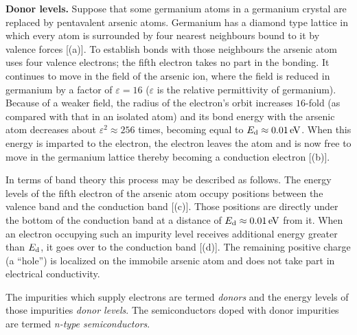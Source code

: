 \textbf{Donor levels.} Suppose that some germanium atoms in a germanium crystal are replaced by pentavalent arsenic atoms. Germanium has a diamond type lattice in which every atom is surrounded by four nearest neighbours bound to it by valence forces [(a)]. To establish bonds with those neighbours the arsenic atom uses four valence electrons; the fifth electron takes no part in the bonding. It continues to move in the field of the arsenic ion, where the field is reduced in germanium by a factor of $\varepsilon=16$ ($\varepsilon$ is the relative permittivity of germanium). Because of a weaker field, the radius of the electron's orbit increases $16$-fold (as compared with that in an isolated atom) and its bond energy with the arsenic atom decreases about $\varepsilon^2\approx 256$ times, becoming equal to $E_{\text{d}}\approx\SI{0.01}{\electronvolt}$. When this energy is imparted to the electron, the electron leaves the atom and is now free to move in the germanium lattice thereby becoming a conduction electron [(b)].

In terms of band theory this process may be described as follows. The energy levels of the fifth electron of the arsenic atom occupy positions between the valence band and the conduction band [(c)]. Those positions are directly under the bottom of the conduction band at a distance of $E_{\text{d}}\approx\SI{0.01}{\electronvolt}$ from it. When an electron occupying such an impurity level receives additional energy greater than $E_{\text{d}}$, it goes over to the conduction band [(d)]. The remaining positive charge (a ``hole'') is localized on the immobile arsenic atom and does not take part in electrical conductivity.

The impurities which supply electrons are termed \textit{donors} and the energy levels of those impurities \textit{donor levels}. The semiconductors doped with donor impurities are termed \textit{n-type semiconductors}.

